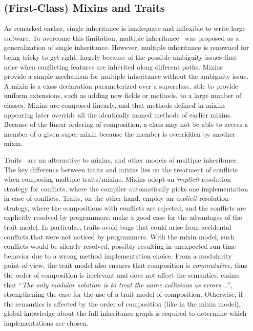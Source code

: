 \subsection{(First-Class) Mixins and Traits}

As remarked earlier, single inheritance is inadequate and inflexible to write
large software. To overcome this limitation, multiple
inheritance~\citep{cardelli1984semantics} was proposed as a generalization of
single inheritance. However, multiple inheritance is renowned for being tricky
to get right, largely because of the possible ambiguity issues that arise when
conflicting features are inherited along different paths.
Mixins~\citep{bracha1990mixin} provide a simple mechanism for multiple
inheritance without the ambiguity issue. A mixin is a class declaration
parameterized over a superclass, able to provide uniform extensions, such as
adding new fields or methods, to a large number of classes. Mixins are composed
linearly, and that methods defined in mixins appearing later override all the
identically named methods of earlier mixins. Because of the linear ordering of
composition, a class may not be able to access a member of a given super-mixin
because the member is overridden by another mixin.

Traits~\citep{scharli2003traits, Ducasse_2006} are an alternative to mixins, and
other models of multiple inheritance. The key difference between traits and
mixins lies on the treatment of conflicts when composing multiple traits/mixins.
Mixins adopt an \emph{implicit} resolution strategy for conflicts, where the
compiler automatically picks one implementation in case of conflicts. Traits, on
the other hand, employ an \emph{explicit} resolution strategy, where the
compositions with conflicts are rejected, and the conflicts are explicitly
resolved by programmers. \citet{scharli2003traits} make a good case for the
advantages of the trait model. In particular, traits avoid bugs that could arise
from accidental conflicts that were not noticed by programmers. With the mixin
model, such conflicts would be silently resolved, possibly resulting in
unexpected run-time behavior due to a wrong method implementation choice. From a
modularity point-of-view, the trait model also ensures that composition is
\emph{commutative}, thus the order of composition is irrelevant and does not
affect the semantics. \citet{bracha1992programming} claims that ``\emph{The only
  modular solution is to treat the name collisions as errors...}'',
strengthening the case for the use of a trait model of composition. Otherwise,
if the semantics is affected by the order of composition (like in the mixin model), global knowledge about
the full inheritance graph is required to determine which implementations are
chosen.

